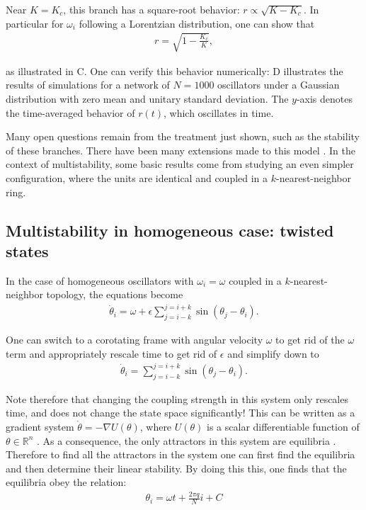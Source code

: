 Near $K=K_c$, this branch has a square-root behavior: $r \propto \sqrt{K-K_c}$. In particular for $\omega_i$ following a Lorentzian distribution, one can show that \cite{kuramoto1984chemical, strogatz2000from}
\begin{align}
    r = \sqrt{1 - \frac{K_c}{K}},
    \label{eq:kuramoto-lorentzian}
\end{align}

as illustrated in C. One can verify this behavior numerically: D illustrates the results of simulations for a network of $N=1000$ oscillators under a Gaussian distribution with zero mean and unitary standard deviation. The $y$-axis denotes the time-averaged behavior of $r(t)$, which oscillates in time.

Many open questions remain from the treatment just shown, such as the stability of these branches. There have been many extensions made to this model \cite{acebron2005kuramoto, rodrigues2016the}. In the context of multistability, some basic results come from studying an even simpler configuration, where the units are identical and coupled in a $k$-nearest-neighbor ring.

\subsection{Multistability in homogeneous case: twisted states}\label{method:sec:kuramoto:twisted}
In the case of homogeneous oscillators with $\omega_i = \omega$ coupled in a $k$-nearest-neighbor topology, the equations become 
%
\begin{align}
    \dot{\theta}_i = \omega + \epsilon \sum_{j=i-k}^{j=i+k} \sin(\theta_j - \theta_i).
\end{align}

One can switch to a corotating frame with angular velocity $\omega$ to get rid of the $\omega$ term and appropriately rescale time to get rid of $\epsilon$ and simplify down to 
%
\begin{align}
    \dot{\theta}_i = \sum_{j=i-k}^{j=i+k} \sin(\theta_j - \theta_i).
\end{align}

Note therefore that changing the coupling strength in this system only rescales time, and does not change the state space significantly! This can be written as a gradient system $\dot{\theta} = - \nabla U(\theta)$, where $U(\theta)$ is a scalar differentiable function of $\theta \in \mathbb{R}^n$ \cite{wiley2006the, strogatz2002nonlinear}. As a consequence, the only attractors in this system are equilibria \cite{wiley2006the}. Therefore to find all the attractors in the system one can first find the equilibria and then determine their linear stability. By doing this this, one finds that the equilibria obey the relation:
%
\begin{align}
    \theta_i = \omega t + \frac{2\pi q}{N} i + C
\end{align}

